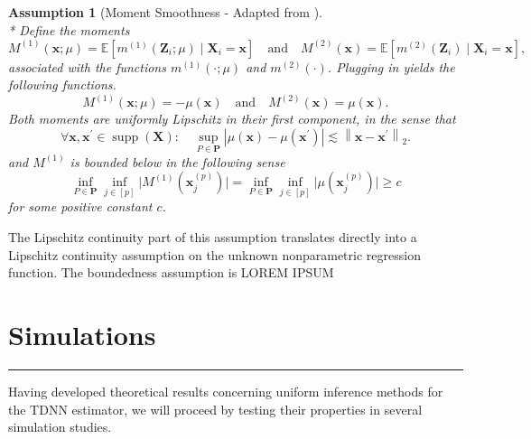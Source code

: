 \documentclass[letterpaper,10pt]{article}
\numberwithin{equation}{section}
\numberwithin{thm}{section}
\numberwithin{lem}{section}
\numberwithin{cor}{section}
\newtheorem{asm}{Assumption}
\newcommand{\1}{\mathbb{1}}
\begin{document}
\begin{asm}[Moment Smoothness - Adapted from \citet{ritzwoller_uniform_2024}]\mbox{}\\*
	Define the moments
	\begin{equation}
		M^{(1)}(\mathbf{x} ; \mu)
		= \mathbb{E}\left[m^{(1)}\left(\mathbf{Z}_i ; \mu\right) \mid \mathbf{X}_i= \mathbf{x}\right]
		\quad \text{and} \quad
		M^{(2)}(\mathbf{x})
		= \mathbb{E}\left[m^{(2)}\left(\mathbf{Z}_i\right) \mid \mathbf{X}_i = \mathbf{x}\right],
	\end{equation}
	associated with the functions $m^{(1)}(\cdot ; \mu)$ and $m^{(2)}(\cdot)$.
	Plugging in yields the following functions.
	\begin{equation}
		M^{(1)}(\mathbf{x} ; \mu)
		= -\mu(\mathbf{x})
		\quad \text{and} \quad
		M^{(2)}(\mathbf{x})
		= \mu(\mathbf{x}).
	\end{equation}
	Both moments are uniformly Lipschitz in their first component, in the sense that
	\begin{equation}
		\forall \mathbf{x}, \mathbf{x}^{\prime} \in \operatorname{supp}\left(\mathbf{X}\right): \quad
		\sup _{P \in \mathbf{P}}
		\left|\mu(\mathbf{x})-\mu\left(\mathbf{x}^{\prime}\right)\right|
		\lesssim\left\|\mathbf{x}-\mathbf{x}^{\prime}\right\|_{2}.
	\end{equation}
	and $M^{(1)}$ is bounded below in the following sense
	\begin{equation}
		\inf_{P \in \mathbf{P}} \inf_{j \in [p]} \Big|M^{(1)}\left(\mathbf{x}^{(p)}_{j}\right) \Big|
		= \inf_{P \in \mathbf{P}} \inf_{j \in [p]} \Big|\mu\left(\mathbf{x}^{(p)}_{j}\right) \Big| \geq c
	\end{equation}
	for some positive constant $c$.
\end{asm}

The Lipschitz continuity part of this assumption translates directly into a Lipschitz continuity assumption on the unknown nonparametric regression function.
The boundedness assumption is
	{\color{red} LOREM IPSUM}

\newpage
\section{Simulations}\label{Simulations}
\hrule

Having developed theoretical results concerning uniform inference methods for the TDNN estimator, we will proceed by testing their properties in several simulation studies.
\end{document}
